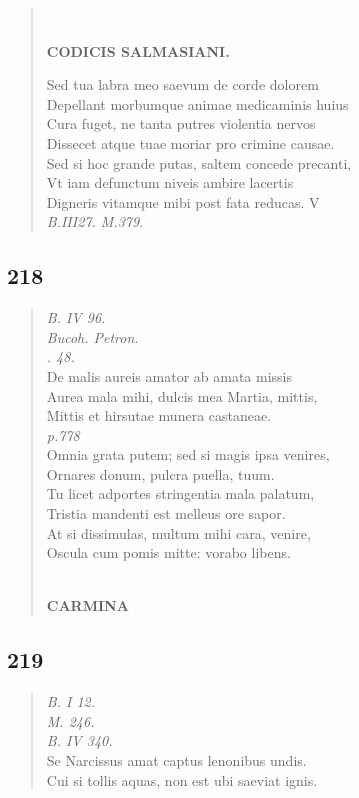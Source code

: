 \documentclass[11pt, a4paper]{report}
\begin{document}
\begin{verse}
        ﻿\pagebreak 
    \begin{center} \textbf{CODICIS SALMASIANI.} \end{center} \marginpar{[185]} Sed tua labra meo saevum de corde dolorem \\ Depellant morbumque animae medicaminis huius \\ Cura fuget, ne tanta putres violentia nervos \\ Dissecet atque tuae moriar pro crimine causae. \\ Sed si hoc grande putas, saltem concede precanti, \\ Vt iam defunctum niveis ambire lacertis \\ Digneris vitamque mibi post fata reducas. V \\ \textit{B.III27. M.379.} \\ 
      \end{verse}
  
            \subsection*{218}
      \begin{verse}
      \textit{B. IV 96.} \\ \textit{Bucoh. Petron.} \\ \textit{. 48.} \\ De malis aureis amator ab amata missis \\ Aurea mala mihi, dulcis mea Martia, mittis, \\ Mittis et hirsutae munera castaneae. \\ \textit{p.778} \\ Omnia grata putem; sed si magis ipsa venires, \\ Ornares donum, pulcra puella, tuum. \\ Tu licet adportes stringentia mala palatum, \\ Tristia mandenti est melleus ore sapor. \\ At si dissimulas, multum mihi cara, venire, \\ Oscula cum pomis mitte: vorabo libens. \\ 
        ﻿\pagebreak 
     \marginpar{[186]} \begin{center} \textbf{CARMINA} \end{center}
      \end{verse}
  
            \subsection*{219}
      \begin{verse}
      \textit{B. I 12.} \\ \textit{M. 246.} \\ \textit{B. IV 340.} \\ Se Narcissus amat captus lenonibus undis. \\ Cui si tollis aquas, non est ubi saeviat ignis. \\ 
      \end{verse}
  
\end{document}
